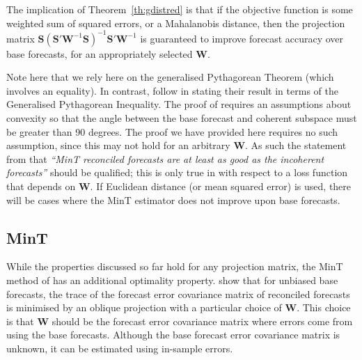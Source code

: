 \documentclass[12pt]{article}
\theoremstyle{definition}
\theoremstyle{property}
\begin{document}
	The implication of Theorem~\ref{th:gdistred} is that if the objective function is some weighted sum of squared errors, or a Mahalanobis distance, then the projection matrix $\bm{S}\left(\bm{S}'\bm{W}^{-1}\bm{S}\right)^{-1}\bm{S}'\bm{W}^{-1}$ is guaranteed to improve forecast accuracy over base forecasts, for an appropriately selected $\bm{W}$.
	
	Note here that we rely here on the generalised Pythagorean Theorem (which involves an equality).  In contrast, \cite{WicEtAl2019} follow \cite{VanErven2015a} in stating their result in terms of the Generalised Pythagorean Inequality.  The proof of \cite{WicEtAl2019} requires an assumptions about convexity so that the angle between the base forecast and coherent subspace must be greater than 90 degrees.  The proof we have provided here requires no such assumption, since this may not hold for an arbitrary $\bm{W}$.  As such the statement from \cite{WicEtAl2019} that {\em``MinT reconciled forecasts are at least as good as the incoherent forecasts''} should be qualified; this is only true in with respect to a loss function that depends on ${\bm W}$.  If Euclidean distance (or mean squared error) is used, there will be cases where the MinT estimator does not improve upon base forecasts.
	
	
	
	\subsection{MinT}
	
	While the properties discussed so far hold for any projection matrix, the MinT method of \cite{WicEtAl2019} has an additional optimality property.  \cite{WicEtAl2019} show that for unbiased base forecasts, the trace of the forecast error covariance matrix of reconciled forecasts is minimised by an oblique projection with a particular choice of $\bm{W}$.  This choice is that $\bm{W}$ should be the forecast error covariance matrix where errors come from using the base forecasts.  Although the base forecast error covariance matrix is unknown, it can be estimated using in-sample errors.
	
\end{document}
